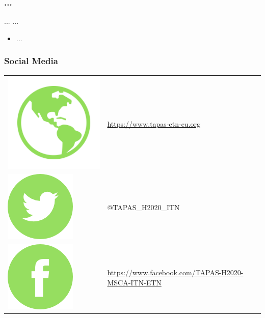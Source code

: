 \documentclass{beamer}
\begin{document}
\begin{frame} 
\frametitle{...} 
\begin{block}{...}
...
\end{block} 
\begin{itemize} 
\item ...
\end{itemize}
\end{frame}


\begin{frame}
\frametitle{Social Media}
\begin{tabular}{ll}
\hspace{-0.1cm}\includegraphics[scale=0.4]{img/website.png} & \url{https://www.tapas-etn-eu.org}\vspace{0.3cm}\\ 
\includegraphics{img/twitter.png} & @TAPAS\_H2020\_ITN\vspace{0.4cm}\\
\includegraphics{img/facebook.png} & \url{https://www.facebook.com/TAPAS-H2020-MSCA-ITN-ETN}
\end{tabular}
\end{frame}
\end{document}
